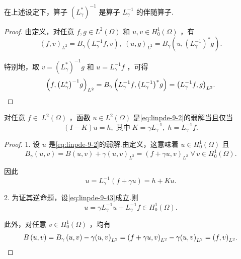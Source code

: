 \begin{lemma}\label{lem:linpde-9-14}
在上述设定下，算子 ${\left( {L}_{\gamma }^{ * }\right) }^{-1}$ 是算子 ${L}_{\gamma }^{-1}$ 的伴随算子.
\end{lemma}

\begin{proof}
由定义，对任意 $f,g \in  {L}^{2}\left( \Omega \right)$ 和 $u,v \in  {H}_{0}^{1}\left( \Omega \right)$ ，有
\[
{\left( f,v\right) }_{{L}^{2}} = {B}_{\gamma }\left(  {{L}_{\gamma }^{-1}f,v}\right)  ,\;{\left( u,g\right) }_{{L}^{2}} = {B}_{\gamma }\left(  {u,{\left( {L}_{\gamma }^{-1}\right) }^{ * }g}\right)  .
\]

特别地，取 $v = {\left( {L}_{\gamma }^{ * }\right) }^{-1}g$ 和 $u = {L}_{\gamma }^{-1}f$ ，可得
\[
{\left( f,{\left( {L}_{\gamma }^{ * }\right) }^{-1}g\right) }_{{L}^{2}} = {B}_{\gamma }\left(  {{L}_{\gamma }^{-1}f,{\left( {L}_{\gamma }^{-1}\right) }^{ * }g}\right)   = {\left( {L}_{\gamma }^{-1}f,g\right) }_{{L}^{2}}.\qedhere
\]
\end{proof}

\begin{lemma}\label{lem:linpde-9-15}
对任意 $f \in \; {L}^{2}\left( \Omega \right)$ ，函数 $u \in  {L}^{2}\left( \Omega \right)$ 是\eqref{eq:linpde-9-2}的弱解当且仅当
\begin{equation}\tag{9.43}\label{eq:linpde-9-43}
\left( {I - K}\right) u = h,\;\text{其中}\;K = \gamma {L}_{\gamma }^{-1},\;h = {L}_{\gamma }^{-1}f.
\end{equation}
\end{lemma}

\begin{proof}
1. 设 $u$ 是\eqref{eq:linpde-9-2}的弱解.由定义，这意味着 $u \in  {H}_{0}^{1}\left( \Omega \right)$ 且
\[
{B}_{\gamma }\left(  {u,v}\right)   = B\left(  {u,v}\right)   + \gamma {\left( u,v\right) }_{{L}^{2}} = {\left( f + \gamma u,v\right) }_{{L}^{2}}\;\forall\,v \in  {H}_{0}^{1}\left( \Omega \right) .
\]

因此
\[
u = {L}_{\gamma }^{-1}\left( {f + {\gamma u}}\right)  = h + {Ku}.
\]

2. 为证其逆命题，设\eqref{eq:linpde-9-43}成立.则
\[
u = \gamma {L}_{\gamma }^{-1}u + {L}_{\gamma }^{-1}f \in  {H}_{0}^{1}\left( \Omega \right) .
\]

此外，对任意 $v \in  {H}_{0}^{1}\left( \Omega \right)$ ，均有
\[
B\left(  {u,v}\right)   = {B}_{\gamma }\left(  {u,v}\right)   - \gamma {\left( u,v\right) }_{{L}^{2}} = {\left( f + \gamma u,v\right) }_{{L}^{2}} - \gamma {\left( u,v\right) }_{{L}^{2}} = {\left( f,v\right) }_{{L}^{2}}.\qedhere
\]
\end{proof}

